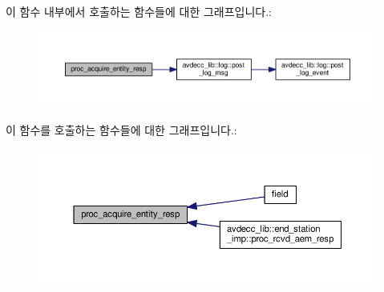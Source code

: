 이 함수 내부에서 호출하는 함수들에 대한 그래프입니다.\+:
\nopagebreak
\begin{figure}[H]
\begin{center}
\leavevmode
\includegraphics[width=350pt]{classavdecc__lib_1_1descriptor__base__imp_a934de13d0b017574d514ce276180a004_cgraph}
\end{center}
\end{figure}




이 함수를 호출하는 함수들에 대한 그래프입니다.\+:
\nopagebreak
\begin{figure}[H]
\begin{center}
\leavevmode
\includegraphics[width=350pt]{classavdecc__lib_1_1descriptor__base__imp_a934de13d0b017574d514ce276180a004_icgraph}
\end{center}
\end{figure}


